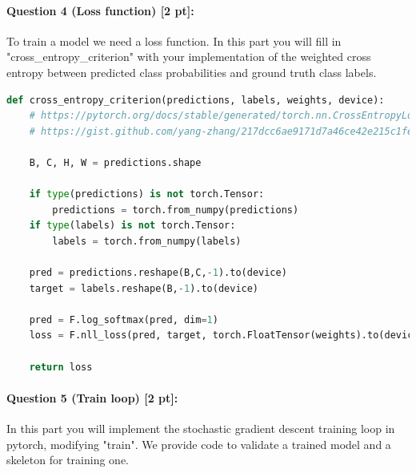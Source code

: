 \documentclass[11pt]{article}
\begin{document}
\paragraph{Question 4 (Loss function) [2 pt]:} 
To train a model we need a loss function. In this part you will fill in "cross\_entropy\_criterion" with your implementation of the weighted cross entropy between predicted class probabilities and ground truth class labels.

\begin{lstlisting}[language=Python, basicstyle=\scriptsize]
def cross_entropy_criterion(predictions, labels, weights, device):
    # https://pytorch.org/docs/stable/generated/torch.nn.CrossEntropyLoss.html#torch.nn.CrossEntropyLoss
    # https://gist.github.com/yang-zhang/217dcc6ae9171d7a46ce42e215c1fee0
    
    B, C, H, W = predictions.shape

    if type(predictions) is not torch.Tensor:
        predictions = torch.from_numpy(predictions)
    if type(labels) is not torch.Tensor:
        labels = torch.from_numpy(labels)

    pred = predictions.reshape(B,C,-1).to(device)
    target = labels.reshape(B,-1).to(device)

    pred = F.log_softmax(pred, dim=1)
    loss = F.nll_loss(pred, target, torch.FloatTensor(weights).to(device))

    return loss
\end{lstlisting}


\paragraph{Question 5 (Train loop) [2 pt]:} 
In this part you will implement the stochastic gradient descent training loop in pytorch, modifying "train". We provide code to validate a trained model and a skeleton for training one. 
\end{document}
